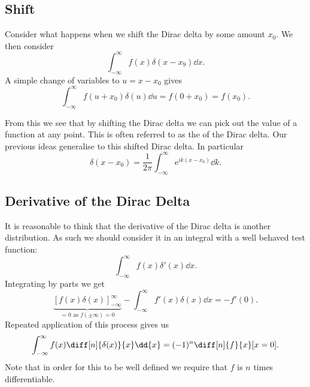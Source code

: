 \documentclass[fleqn]{NotesClass}
\newcommand*{\e}{\mathrm{e}}
\begin{document}
    \subsection{Shift}
    Consider what happens when we shift the Dirac delta by some amount \(x_0\).
    We then consider
    \begin{equation}
        \int_{-\infty}^{\infty} f(x)\delta(x - x_9) \dd{x}.
    \end{equation}
    A simple change of variables to \(u = x - x_0\) gives
    \begin{equation}
        \int_{-\infty}^{\infty} f(u + x_0)\delta(u) \dd{u} = f(0 + x_0) = f(x_0).
    \end{equation}
    
    From this we see that by shifting the Dirac delta we can pick out the value of a function at any point.
    This is often referred to as the  of the Dirac delta.
    Our previous ideas generalise to this shifted Dirac delta.
    In particular
    \begin{equation}\label{eqn:integral representation of dirac delta}
        \delta(x - x_0) = \frac{1}{2\pi} \int_{-\infty}^{\infty} \e^{ik(x - x_0)} \dd{k}.
    \end{equation}
    
    \subsection{Derivative of the Dirac Delta}
    It is reasonable to think that the derivative of the Dirac delta is another distribution.
    As such we should consider it in an integral with a well behaved test function:
    \begin{equation}
        \int_{-\infty}^{\infty} f(x)\delta'(x) \dd{x}.
    \end{equation}
    Integrating by parts we get
    \begin{equation}
        \underbrace{[f(x)\delta(x)]_{-\infty}^{\infty}}_{=0\text{ as } f(\pm \infty) = 0} - \int_{-\infty}^{\infty} f'(x)\delta(x) \dd{x} = -f'(0).
    \end{equation}
    Repeated application of this process gives us
    \begin{equation}
        \int_{-\infty}^{\infty} f(x) \diff[n]{\delta(x)}{x} \dd{x} = (-1)^n \diff[n]{f}{x}[x=0].
    \end{equation}
    Note that in order for this to be well defined we require that \(f\) is \(n\) times differentiable.
    
\end{document}
